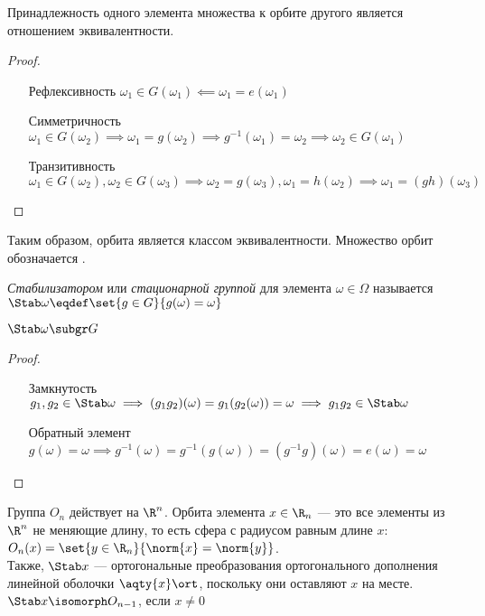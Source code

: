 \begin{theorem}
  Принадлежность одного элемента множества к орбите другого является отношением эквивалентности.
\end{theorem}
\begin{proof}
  \theoremlistshack
  \begin{itemize}[leftmargin=22ex, align=left, labelwidth=20ex]
    \item[Рефлексивность] $\omega_1\in G(\omega_1) \impliedby \omega_1=e(\omega_1)$
    \item[Симметричность] $\omega_1\in G(\omega_2) \implies \omega_1=g(\omega_2)\implies g^{-1}(\omega_1)=\omega_2\implies \omega_2\in G(\omega_1)$
    \item[Транзитивность] $\omega_1\in G(\omega_2), \omega_2\in G(\omega_3)\implies \omega_2=g(\omega_3), \omega_1=h(\omega_2)\implies \omega_1=(gh)(\omega_3)$
  \end{itemize}
\end{proof}

\begin{denotation}
  Таким образом, орбита является классом эквивалентности. Множество орбит обозначается .
\end{denotation}

\begin{definition}
  \emph{Стабилизатором} или \emph{стационарной группой} для элемента $\omega\in\Omega$ называется $\Stab \omega \eqdef\set{g\in G}{g(\omega)=\omega}$
\end{definition}

\begin{theorem}
  $\Stab \omega \subgr G$
\end{theorem}
\begin{proof}
  \theoremlistshack
  \begin{itemize}[leftmargin=22ex, align=left, labelwidth=20ex]
    \item [Замкнутость] $g_1,g_2\in \Stab\omega\implies (g_1g_2)(\omega)=g_1(g_2(\omega))=\omega\implies g_1g_2\in \Stab\omega$
    \item [Обратный элемент] $g(\omega)=\omega\implies g^{-1}(\omega)=g^{-1}(g(\omega))=(g^{-1} g)(\omega)=e(\omega)=\omega$
  \end{itemize}
\end{proof}

\begin{example}
  Группа $O_n$ действует на $\R^n$. Орбита элемента $x\in \R_n$ --- это все элементы из $\R^n$ не меняющие длину, то есть сфера с радиусом равным длине $x$: $O_n(x)=\set{y\in \R_n}{\norm{x}=\norm{y}}$.\\
  Также, $\Stab x$ --- ортогональные преобразования ортогонального дополнения линейной оболочки $\aqty{x}\ort$, поскольку они оставляют $x$ на месте. $\Stab x\isomorph O_{n-1}$, если $x\neq0$
\end{example}

